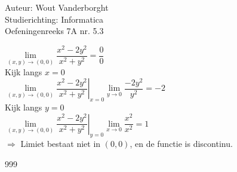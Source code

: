 \documentclass[a4paper]{article}
\newcommand{\Limit}{\lim\limits_}
\begin{document}
  
\noindent \large Auteur: Wout Vanderborght\\
\noindent \large Studierichting: Informatica\\
\noindent \large Oefeningenreeks 7A nr. 5.3\\

\medskip

\normalsize

$ \Limit{(x, y) \rightarrow (0, 0)} \dfrac{x^2-2y^2}{x^2+y^2} = \dfrac{0}{0} $ \\

Kijk langs $x = 0$ \\

$ \left. \Limit{(x, y) \rightarrow (0, 0)} \dfrac{x^2-2y^2}{x^2+y^2} \right|_{x=0} \Limit{y \rightarrow 0} \dfrac{-2y^2}{y^2} = -2 $ \\

Kijk langs $y = 0$ \\

$ \left. \Limit{(x, y) \rightarrow (0, 0)} \dfrac{x^2-2y^2}{x^2+y^2} \right|_{y=0} \Limit{x \rightarrow 0} \dfrac{x^2}{x^2} = 1 $ \\

$ \Rightarrow$ Limiet bestaat niet in $(0, 0)$, en de functie is discontinu. \\

\begin{thebibliography}{999}
\end{thebibliography}
\end{document}
